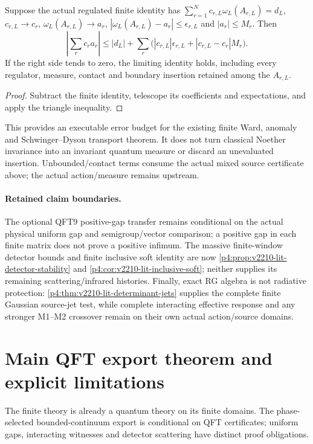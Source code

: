\documentclass[12pt,a4paper]{article}
\begin{document}
\begin{proposition}
\label{p12:prop:v2210-lit-ward-budget}
Suppose the actual regulated finite identity has
$\sum_{r=1}^N c_{r,L}\omega_L(A_{r,L})=d_L$,
$c_{r,L}\to c_r$, $\omega_L(A_{r,L})\to a_r$,
$|\omega_L(A_{r,L})-a_r|\le\epsilon_{r,L}$ and $|a_r|\le M_r$.
Then
\[
 \left|\sum_rc_ra_r\right|
 \le |d_L|+\sum_r\bigl(|c_{r,L}|\epsilon_{r,L}
              +|c_{r,L}-c_r|M_r\bigr).
\]
If the right side tends to zero, the limiting identity holds, including
every regulator, measure, contact and boundary insertion retained among
the $A_{r,L}$.
\end{proposition}
\begin{proof}
Subtract the finite identity, telescope its coefficients and expectations,
and apply the triangle inequality.
\end{proof}
This provides an executable error budget for the existing finite Ward,
anomaly and Schwinger--Dyson transport theorem. It does not turn classical
Noether invariance into an invariant quantum measure or discard an
unevaluated insertion. Unbounded/contact terms consume the actual mixed
source certificate above; the actual action/measure remains upstream.

\paragraph{Retained claim boundaries.}
The optional QFT9 positive-gap transfer remains conditional on the actual
physical uniform gap and semigroup/vector comparison; a positive gap in
each finite matrix does not prove a positive infimum. The massive
finite-window detector bounds and finite inclusive soft identity are now
\ref{p4:prop:v2210-lit-detector-stability} and
\ref{p4:cor:v2210-lit-inclusive-soft}; neither supplies its remaining
scattering/infrared histories. Finally, exact RG algebra is not radiative
protection: \ref{p4:thm:v2210-lit-determinant-jets} supplies the complete
finite Gaussian source-jet test, while complete interacting effective
response and any stronger M1--M2 crossover remain on their own actual
action/source domains.



\section{Main QFT export theorem and explicit limitations}
\label{p12:sec:v237-c8}
The finite theory is already a quantum theory on its finite domains. The phase-selected bounded-continuum export is conditional on QFT certificates; uniform gaps, interacting witnesses and detector scattering have distinct proof obligations.
\end{document}
